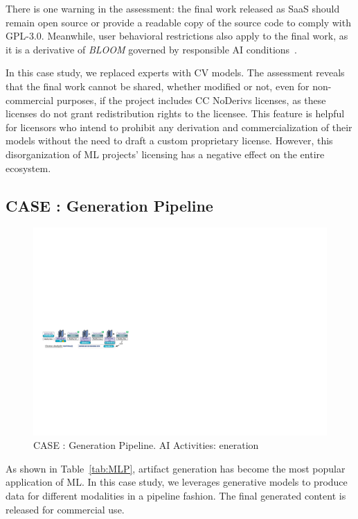 There is one warning in the assessment: the final work released as SaaS should remain open source or provide a readable copy of the source code to comply with GPL-3.0. 
Meanwhile, user behavioral restrictions also apply to the final work, as it is a derivative of \textit{BLOOM} governed by responsible AI conditions~\cite{contractor2022behavioral}.

In this case study, we replaced experts with CV models. 
The assessment reveals that the final work cannot be shared, whether modified or not, even for non-commercial purposes, if the project includes CC NoDerivs licenses, as these licenses do not grant redistribution rights to the licensee.
This feature is helpful for licensors who intend to prohibit any derivation and commercialization of their models without the need to draft a custom proprietary license.
However, this disorganization of ML projects' licensing has a negative effect on the entire ecosystem.


\subsection{CASE  : Generation Pipeline}

\begin{figure}[h]
    \centering
    \includegraphics[width=\linewidth]{fig/case3.pdf}
    \caption{CASE : Generation Pipeline. AI Activities: eneration}
    \Description{}
    \label{fig:case3}
\end{figure}

As shown in Table~\ref{tab:MLP}, artifact generation has become the most popular application of ML.
In this case study, we leverages generative models to produce data for different modalities in a pipeline fashion.
The final generated content is released for commercial use.

